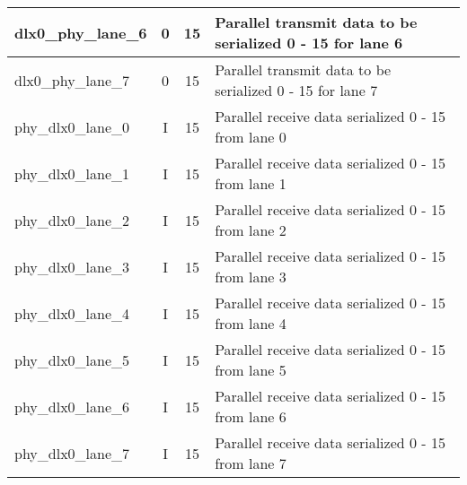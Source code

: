 \begin{emulation}
\begin{center}
\begin{longtable}{ l | c | c | p{.55\linewidth} }
      dlx0\_phy\_lane\_6              & 0   & 15  & Parallel transmit data to be serialized 0 - 15 for lane 6 \\ \hline
      dlx0\_phy\_lane\_7              & 0   & 15  & Parallel transmit data to be serialized 0 - 15 for lane 7 \\ \hline
      phy\_dlx0\_lane\_0              & I   & 15  & Parallel receive data serialized 0 - 15 from lane 0 \\ \hline
      phy\_dlx0\_lane\_1              & I   & 15  & Parallel receive data serialized 0 - 15 from lane 1 \\ \hline
      phy\_dlx0\_lane\_2              & I   & 15  & Parallel receive data serialized 0 - 15 from lane 2 \\ \hline
      phy\_dlx0\_lane\_3              & I   & 15  & Parallel receive data serialized 0 - 15 from lane 3 \\ \hline
      phy\_dlx0\_lane\_4              & I   & 15  & Parallel receive data serialized 0 - 15 from lane 4 \\ \hline
      phy\_dlx0\_lane\_5              & I   & 15  & Parallel receive data serialized 0 - 15 from lane 5 \\ \hline
      phy\_dlx0\_lane\_6              & I   & 15  & Parallel receive data serialized 0 - 15 from lane 6 \\ \hline
      phy\_dlx0\_lane\_7              & I   & 15  & Parallel receive data serialized 0 - 15 from lane 7 \\ \hline
    \end{longtable}
  \end{center}
\end{emulation}
